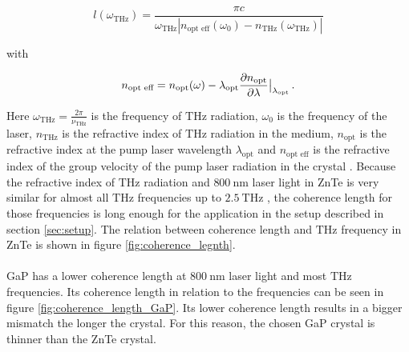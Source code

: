 \begin{equation}
    l(\omega_{\si{\tera\hertz}}) = \frac{\pi c}{\omega_{\si{\tera\hertz}} \left | n_\text{opt eff}(\omega_0) - n_{\si{\tera\hertz}}(\omega_{\si{\tera\hertz}})\right |}
\end{equation}

with 

\begin{equation}
    n_{\text{opt eff}} = n_\text{opt}(\omega) - \lambda_\text{opt}\frac{\partial n_\text{opt}}{\partial \lambda}\big{|}_{\lambda_\text{opt}} \, .  
\end{equation}

Here $\omega_{\si{\tera\hertz}} = \frac{2\pi}{\nu_{\si{\tera\hertz}}}$ is the frequency of $\si{\tera\hertz}$ radiation, $\omega_0$ is the frequency of the laser, $n_{\si{\tera\hertz}}$ is the refractive index of $\si{\tera\hertz}$ radiation in the medium, $n_\text{opt}$ is the refractive index at the pump laser wavelength $\lambda_\text{opt}$ and $n_\text{opt eff}$ is the refractive index of the group velocity of the pump laser radiation in the crystal \cite{coherence_legnth}.
Because the refractive index of $\si{\tera\hertz}$ radiation and $\SI{800}{\nano\meter}$ laser light in ZnTe is very similar for almost all $\si{\tera\hertz}$ frequencies up to $\SI{2.5}{\tera\hertz}$ \cite{coherence_legnth}, the coherence length for those frequencies is long enough for the application in the setup described in section \ref{sec:setup}.
The relation between coherence length and $\si{\tera\hertz}$ frequency in ZnTe is shown in figure \ref{fig:coherence_legnth}.
\\\\
GaP has a lower coherence length at $\SI{800}{\nano\meter}$ laser light and most $\si{\tera\hertz}$ frequencies.
Its coherence length in relation to the frequencies can be seen in figure \ref{fig:coherence_length_GaP}.
Its lower coherence length results in a bigger mismatch the longer the crystal.
For this reason, the chosen GaP crystal is thinner than the ZnTe crystal.
